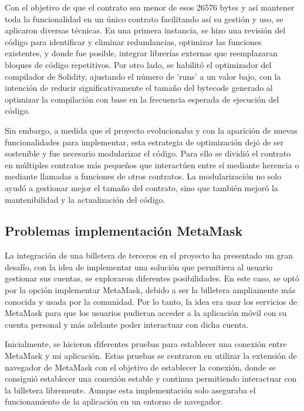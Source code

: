 Con el objetivo de que el contrato sea menor de esos 26576 bytes y así mantener toda la funcionalidad en un único contrato facilitando así su gestión y uso, se aplicaron diversas técnicas.
En una primera instancia, se hizo una revisión del código para identificar y eliminar redundancias, optimizar las funciones existentes, y donde fue posible, integrar librerías externas que reemplazaran bloques de código repetitivos.
Por otro lado, se habilitó el optimizador del compilador de Solidity, ajustando el número de 'runs' a un valor bajo, con la intención de reducir significativamente el tamaño del bytecode generado al optimizar la compilación con base en la frecuencia esperada de ejecución del código.

Sin embargo, a medida que el proyecto evolucionaba y con la aparición de nuevas funcionalidades para implementar, esta estrategia de optimización dejó de ser sostenible y fue necesario modularizar el código. 
Para ello se dividió el contrato en múltiples contratos más pequeños que interactúen entre sí mediante herencia o mediante llamadas a funciones de otros contratos.
La modularización no solo ayudó a gestionar mejor el tamaño del contrato, sino que también mejoró la mantenibilidad y la actualización del código.



\subsection{Problemas implementación MetaMask}

La integración de una billetera de terceros en el proyecto ha presentado un gran desafío, con la idea de implementar una solución que permitiera al usuario gestionar sus cuentas, se exploraron diferentes posibilidades.
En este caso, se optó por la opción implementar MetaMask, debido a ser la billetera ampliamente más conocida y usada por la comunidad. 
Por lo tanto, la idea era usar los servicios de MetaMask para que los usuarios pudieran acceder a la aplicación móvil con su cuenta personal y más adelante poder interactuar con dicha cuenta.

Inicialmente, se hicieron diferentes pruebas para establecer una conexión entre MetaMask y mi aplicación. Estas pruebas se centraron en utilizar la extensión de navegador de MetaMask con el objetivo de establecer la conexión, donde se consiguió establecer una conexión estable y continua permitiendo interactuar con la billetera libremente. Aunque esta implementación solo aseguraba el funcionamiento de la aplicación en un entorno de navegador.

